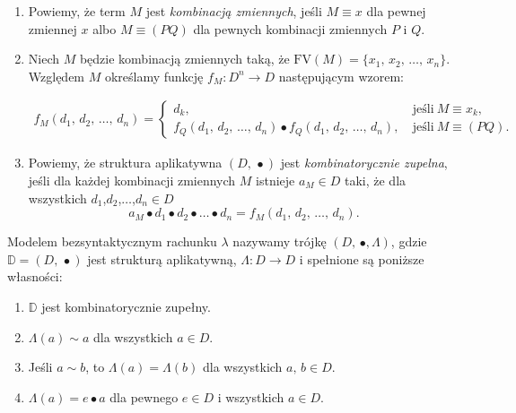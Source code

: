 \begin{definicja}%
\begin{enumerate}
  \setlength\itemsep{0em}
\item
Powiemy, że term \(M\) jest \emph{kombinacją zmiennych}, jeśli \(M\equiv x\) dla pewnej zmiennej \(x\) albo \(M\equiv (PQ)\) dla pewnych kombinacji zmiennych \(P\) i \(Q\). 
\item 
Niech \(M\) będzie kombinacją zmiennych taką, że \(\mathrm{FV}(M)=\{x_1,\,x_2,\,\dots,\,x_n\}\). Względem \(M\) określamy funkcję \(f_M: D^n\to D\) następującym wzorem:

\begin{align*}
f_M (d_1,\,d_2,\,\dots,\,d_n) = \begin{cases}
d_k,\ &\text{jeśli}\ M\equiv x_k, \\
f_Q (d_1,\,d_2,\,\dots,\,d_n) \bullet f_Q (d_1,\,d_2,\,\dots,\,d_n),\ & \text{jeśli}\ M\equiv (PQ).
\end{cases}
\end{align*}

\item
Powiemy, że struktura aplikatywna \((D,\,\bullet)\) jest \emph{kombinatorycznie zupelna}, jeśli dla każdej kombinacji zmiennych \(M\) istnieje \(a_M\in D\) taki, że dla wszystkich \(d_1\),\(d_2\),\(\dots\),\(d_n\in D\)
\[
  a_M\bullet d_1 \bullet d_2 \bullet \dots \bullet d_n = f_M(d_1,\, d_2,\,\dots,\,d_n).
\]
\end{enumerate}
\end{definicja}


\begin{definicja}%
  Modelem bezsyntaktycznym rachunku \(\lambda\) nazywamy trójkę \((D,\,\bullet, \Lambda)\), gdzie \(\mathbb{D}=(D,\,\bullet)\) jest strukturą aplikatywną, \(\Lambda: D \to D\) i spełnione są poniższe własności:
  \begin{enumerate}[label={(\alph*)}, ref={(\alph*)}]
  \setlength\itemsep{0em}
    \item \(\mathbb{D}\) jest kombinatorycznie zupełny.
    \item \(\Lambda (a) \sim a\) dla wszystkich \(a\in D\).
    \item Jeśli \(a\sim b\), to \(\Lambda(a) = \Lambda(b)\) dla wszystkich \(a,\,b\in D\).
    \item \(\Lambda(a)=e\bullet a\) dla pewnego \(e\in D\) i wszystkich \(a\in D\).
  \end{enumerate}
\end{definicja}

